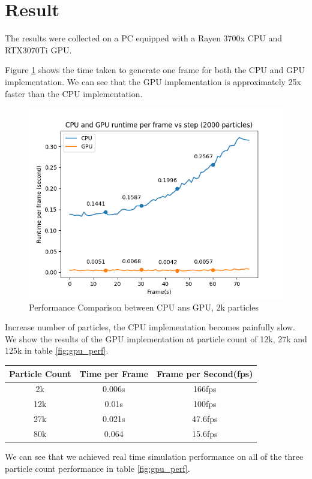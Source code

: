 \documentclass[sigconf]{acmart}
\begin{document}
\section{Result}
The results were collected on a PC equipped with a Rayen 3700x CPU and RTX3070Ti GPU.

Figure \ref{fig:perf} shows the time taken to generate one frame for both the CPU and GPU implementation. We can see that the GPU implementation is approximately 25x faster than the CPU implementation.
\begin{figure}
  \centering
  \includegraphics[width=\linewidth]{image/cpu-gpu-comprasion.png}
  \caption{Performance Comparison between CPU ans GPU, 2k particles}
\label{fig:perf}
\end{figure}

Increase number of particles, the CPU implementation becomes painfully slow. We show the results of the GPU implementation at particle count of 12k, 27k and 125k in table \ref{fig:gpu_perf}.
\begin{center}
  \begin{tabular}{| c | c | c |}
    \hline
    Particle Count & Time per Frame & Frame per Second(fps)  \\
    \hline
    2k & 0.006s & 166fps \\
    \hline
    12k & 0.01s &  100fps \\
    \hline
    27k & 0.021s & 47.6fps \\
    \hline
    80k & 0.064 & 15.6fps \\
    \hline
  \end{tabular}
\end{center}
We can see that we achieved real time simulation performance on all of the three particle count performance in table \ref{fig:gpu_perf}.
\end{document}
